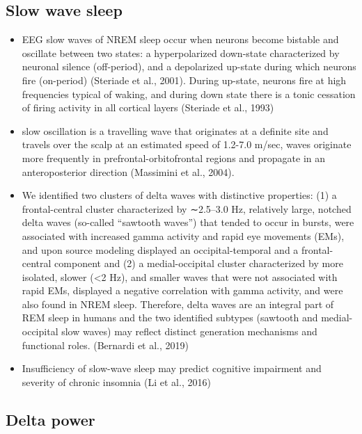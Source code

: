 \documentclass[
]{article}
\begin{document}
\subsection{Slow wave sleep}\label{slow-wave-sleep}

\begin{itemize}
\item
  EEG slow waves of NREM sleep occur when neurons become bistable and
  oscillate between two states: a hyperpolarized down-state
  characterized by neuronal silence (off-period), and a depolarized
  up-state during which neurons fire (on-period) (Steriade et al.,
  2001). During up-state, neurons fire at high frequencies typical of
  waking, and during down state there is a tonic cessation of firing
  activity in all cortical layers (Steriade et al., 1993)
\item
  slow oscillation is a travelling wave that originates at a definite
  site and travels over the scalp at an estimated speed of 1.2-7.0
  m/sec, waves originate more frequently in prefrontal-orbitofrontal
  regions and propagate in an anteroposterior direction (Massimini et
  al., 2004).
\item
  We identified two clusters of delta waves with distinctive properties:
  (1) a frontal-central cluster characterized by ∼2.5--3.0 Hz,
  relatively large, notched delta waves (so-called ``sawtooth waves'')
  that tended to occur in bursts, were associated with increased gamma
  activity and rapid eye movements (EMs), and upon source modeling
  displayed an occipital-temporal and a frontal-central component and
  (2) a medial-occipital cluster characterized by more isolated, slower
  (\textless2 Hz), and smaller waves that were not associated with rapid
  EMs, displayed a negative correlation with gamma activity, and were
  also found in NREM sleep. Therefore, delta waves are an integral part
  of REM sleep in humans and the two identified subtypes (sawtooth and
  medial-occipital slow waves) may reflect distinct generation
  mechanisms and functional roles. (Bernardi et al., 2019)
\item
  Insufficiency of slow-wave sleep may predict cognitive impairment and
  severity of chronic insomnia (Li et al., 2016)
\end{itemize}

\subsection{Delta power}\label{delta-power}
\end{document}
